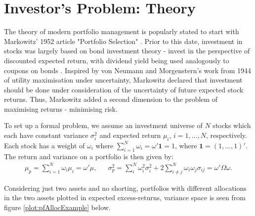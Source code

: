 \documentclass[11pt,a4paper,oneside]{article}
\newcommand{\lp}{\left(}
\newcommand{\rp}{\right)}
\begin{document}
\rfoot{\thepage}

\setcounter{page}{1}

\section{Investor's Problem: Theory}
The theory of modern portfolio management is popularly stated to start with Markowitz' 1952 article "Portfolio Selection" \cite{MPT52}. Prior to this date, investment in stocks was largely based on bond investment theory - invest in the perspective of discounted expected return, with dividend yield being used analogously to coupons on bonds \cite{guerard2016}. Inspired by von Neumann and Morgenstern's work from 1944 \cite{vnm1944} of utility maximisation under uncertainty, Markowitz declared that investment should be done under consideration of the uncertainty of future expected stock returns. Thus, Markowitz added a second dimension to the problem of maximising returns - minimising risk.

To set up a formal problem, we assume an investment universe of $N$ stocks which each have constant variance $\sigma_i^2$ and expected return $\mu_i$, $i = 1, \dots, N$, respectively. Each stock has a weight of $\omega_i$ where $\sum_{i = 1}^N \omega_i = \omega'\mathbf{1} = 1$, where $\mathbf{1} = \lp 1, \dots, 1\rp'$. The return and variance on a portfolio is then given by:
\begin{align*}
    \mu_p = \sum_{i=1}^N \omega_i \mu_i = \omega'\mu, &&
    \sigma_p^2 = \sum_{i}^N \omega_i^2 \sigma_i^2 + 2 \sum_{i\neq j}^N \omega_i\omega_j \sigma_{ij} = \omega'\Omega \omega.
\end{align*}

Considering just two assets and no shorting, portfolios with different allocations in the two assets plotted in expected excess-returns, variance space is seen from figure \ref{plot:pfAllocExample} below.

\end{document}
